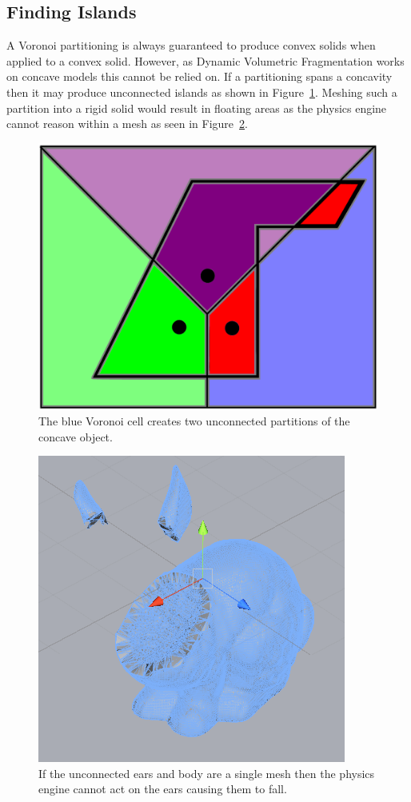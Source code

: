 \subsection{Finding Islands}

\label{sect:islands}

A Voronoi partitioning is always guaranteed to produce convex solids when applied to a convex solid. However, as Dynamic Volumetric Fragmentation works on concave models this cannot be relied on. If a partitioning spans a concavity then it may produce unconnected islands as shown in Figure~\ref{fig:3.5}. Meshing such a partition into a rigid solid would result in floating areas as the physics engine cannot reason within a mesh as seen in Figure~\ref{fig:3.5.1}.

\begin{figure}
\centerline{\includegraphics[scale=0.5]{island13.pdf}}
\caption{The blue Voronoi cell creates two unconnected partitions of the concave object.}
\label{fig:3.5}
\end{figure}

\begin{figure}
\centerline{\includegraphics[scale=0.5]{islands.png}}
\caption{If the unconnected ears and body are a single mesh then the physics engine cannot act on the ears causing them to fall.}
\label{fig:3.5.1}
\end{figure}

